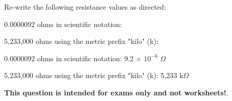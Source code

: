 

Re-write the following resistance values as directed:

\vskip 10pt

0.0000092 ohms in scientific notation: \underbar{\hskip 100pt}

\vskip 10pt

5,233,000 ohms using the metric prefix "kilo" (k): \underbar{\hskip 100pt}







\vskip 10pt

0.0000092 ohms in scientific notation: 9.2 $\times$ $10^{-6}$ $\Omega$

\vskip 10pt

5,233,000 ohms using the metric prefix "kilo" (k): 5,233 k$\Omega$







{\bf This question is intended for exams only and not worksheets!}.



